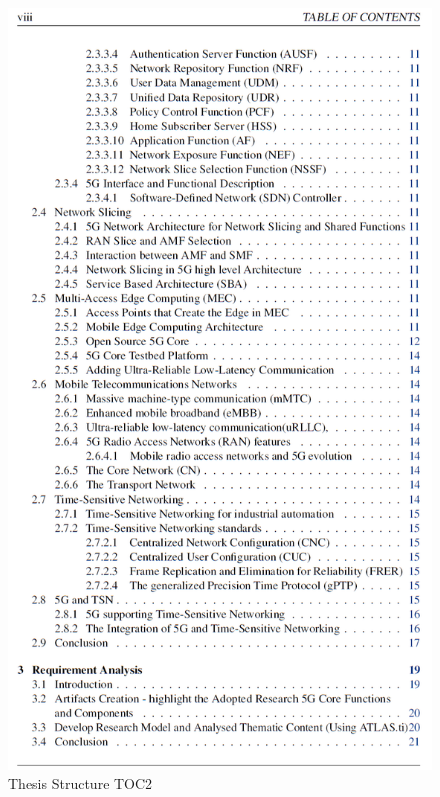 \begin{figure}

 
  \centering
\includegraphics[scale=0.39]{images/Thesis-TOC2.png} 
\caption{Thesis Structure TOC2}
\label{fig:Thesis-TOC2}
 \end{figure}
 
 
 
